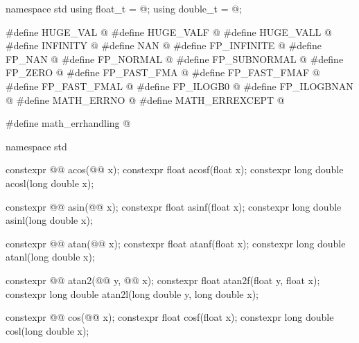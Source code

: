 %
%
%
%
%
%
%
%
%
%
%
%
%
%
%
%
%
%
%
%
%
%
%
%
%
%
\begin{codeblock}
namespace std {
  using float_t = @\seebelow@;
  using double_t = @\seebelow@;
}

#define HUGE_VAL @\seebelow@
#define HUGE_VALF @\seebelow@
#define HUGE_VALL @\seebelow@
#define INFINITY @\seebelow@
#define NAN @\seebelow@
#define FP_INFINITE @\seebelow@
#define FP_NAN @\seebelow@
#define FP_NORMAL @\seebelow@
#define FP_SUBNORMAL @\seebelow@
#define FP_ZERO @\seebelow@
#define FP_FAST_FMA @\seebelow@
#define FP_FAST_FMAF @\seebelow@
#define FP_FAST_FMAL @\seebelow@
#define FP_ILOGB0 @\seebelow@
#define FP_ILOGBNAN @\seebelow@
#define MATH_ERRNO @\seebelow@
#define MATH_ERREXCEPT @\seebelow@

#define math_errhandling @\seebelow@

namespace std {
  constexpr @@ acos(@@ x);
  constexpr float               acosf(float x);
  constexpr long double         acosl(long double x);

  constexpr @@ asin(@@ x);
  constexpr float               asinf(float x);
  constexpr long double         asinl(long double x);

  constexpr @@ atan(@@ x);
  constexpr float               atanf(float x);
  constexpr long double         atanl(long double x);

  constexpr @@ atan2(@@ y, @@ x);
  constexpr float               atan2f(float y, float x);
  constexpr long double         atan2l(long double y, long double x);

  constexpr @@ cos(@@ x);
  constexpr float               cosf(float x);
  constexpr long double         cosl(long double x);

}
\end{codeblock}
